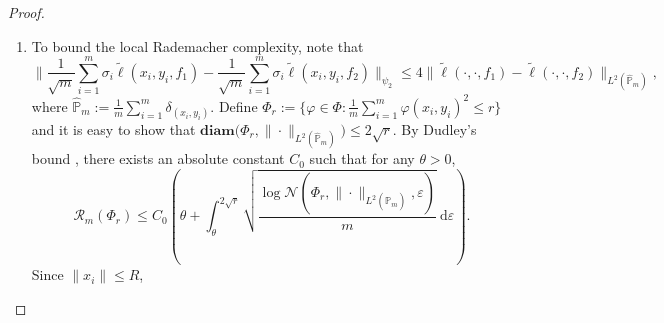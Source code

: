 \documentclass{article}
\numberwithin{equation}{section}
\newcommand{\E}{\mathbb{E}}
\newcommand{\dif}{\mathrm{d}}
\theoremstyle{definition}
\renewcommand{\P}{\mathbb{P}}
\begin{document}
\begin{proof}
\begin{enumerate}[label=\textbf{Step \arabic*.}]
\begin{equation}
\begin{aligned}
                    &= \E_{(x,y)\sim\P}\left[\mathbbm{1}_{\|x\|_\infty\leq R} \left(\E_{t,x_t|x}\|s_{f,h}(x_t,y,t)-\nabla_x\log\phi_t(x_t|x)\|^2-\|s_*^\P(x_t,y,t)-\nabla_x\log\phi_t(x_t|x)\|^2\right)^2\right] \\
                    &\leq \E_{(x,y)\sim\P} \left[\mathbbm{1}_{\|x\|_\infty\leq R}\left(\E_{t,x_t|x}\|s_{f,h}(x_t,y,t)-s_*^\P(x_t,y,t)\|^2\right)\right.\\
                    &\qquad\qquad\qquad \left.\cdot \left(\E_{t,x_t|x}\|s_{f,h}(x_t,y,t)+s_*^\P(x_t,y,t)-2\nabla_x\log\phi_t(x_t|x)\|^2\right)\right] \\
                    &\leq 4M\E_{(x,y)\sim\P} \left[\mathbbm{1}_{\|x\|_\infty\leq R}\left(\E_{t,x_t|x}\|s_{f,h}(x_t,y,t)-s_*^\P(x_t,y,t)\|^2\right)\right] \\
                    &\leq 4M \E_{(x,y)\sim\P}\left(\ell(x,y,s_{f,h})-\ell(x,y,s_*^\P)\right) \\
                    &\leq 4M\E_{(x,y)\sim\P} [\widetilde{\ell}(x,y,f)] + 8M^2\exp(-C_1'R^2).
                \end{aligned}
            \end{equation}
        \item To bound the local Rademacher complexity, note that
            \begin{equation}
                \Big\|\frac{1}{\sqrt{m}} \sum_{i=1}^m\sigma_i\widetilde{\ell}(x_i,y_i,f_1) - \frac{1}{\sqrt{m}}\sum_{i=1}^m\sigma_i\widetilde{\ell}(x_i,y_i,f_2) \Big\|_{\psi_2} \leq 4\|\widetilde{\ell}(\cdot,\cdot,f_1)-\widetilde{\ell}(\cdot,\cdot,f_2)\|_{L^2(\widehat{\P}_m)},
            \end{equation}
            where $\widehat{\P}_m:=\frac{1}{m}\sum_{i=1}^m\delta_{(x_i,y_i)}$.
            Define $\Phi_r:=\{\varphi\in\Phi:\frac{1}{m}\sum_{i=1}^m\varphi(x_i,y_i)^2\leq r\}$
            and it is easy to show that $\textbf{diam}\big(\Phi_r,\|\cdot\|_{L^2(\widehat{\P}_m)}\big)\leq 2\sqrt{r}$.
            By Dudley's bound \citep{van2014probability,wainwright2019high}, there exists an absolute constant $C_0$ such that for any $\theta>0$,
            \begin{equation}\label{eq:rademacher_bound_2}
                \mathcal{R}_m(\Phi_r)\leq C_0\left(\theta+\int_\theta^{2\sqrt{r}}\sqrt{\frac{\log\mathcal{N}(\Phi_r,\|\cdot\|_{L^2(\widehat{\P}_m)},\varepsilon)}{m}}\ \dif\varepsilon\right).
            \end{equation}
            Since $\|x_i\|\leq R$,
            \begin{equation}

\end{equation}
\end{enumerate}
\end{proof}
\end{document}
